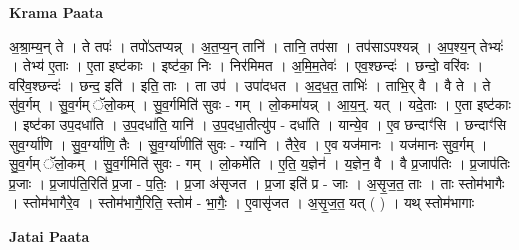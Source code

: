 \documentclass[17pt]{extarticle}
\begin{document}
\textbf{Krama Paata} \newline

अ॒श्रा॒म्य॒न् ते । ते तपः॑ । तपो॑ऽतप्यन्न् । अ॒त॒प्य॒न् तानि॑ । तानि॒ तप॑सा । तप॑साऽपश्यन्न् । अ॒प॒श्य॒न् तेभ्यः॑ । तेभ्य॑ ए॒ताः । ए॒ता इष्ट॑काः । इष्ट॑का॒ निः । निर॑मिमत । अ॒मि॒म॒तेवः॑ । एव॒श्छन्दः॑ । छन्दो॒ वरि॑वः । वरि॑व॒श्छन्दः॑ । छन्द॒ इति॑ । इति॒ ताः । ता उप॑ । उपा॑दधत । अ॒द॒ध॒त॒ ताभिः॑ । ताभि॒र् वै । वै ते । ते सु॑व॒र्गम् । सु॒व॒र्गम् ॅलो॒कम् । सु॒व॒र्गमिति॑ सुवः - गम् । लो॒कमा॑यन्न् । आ॒य॒न्॒. यत् । यदे॒ताः । ए॒ता इष्ट॑काः । इष्ट॑का उप॒दधा॑ति । उ॒प॒दधा॑ति॒ यानि॑ । उ॒प॒दधा॒तीत्यु॑प - दधा॑ति । यान्ये॒व । ए॒व छन्दाꣳ॑सि । छन्दाꣳ॑सि सुव॒र्ग्या॑णि । सु॒व॒र्ग्या॑णि॒ तैः । सु॒व॒र्ग्या॑णीति॑ सुवः - ग्या॑नि । तैरे॒व । ए॒व यज॑मानः । यज॑मानः सुव॒र्गम् । सु॒व॒र्गम् ॅलो॒कम् । सु॒व॒र्गमिति॑ सुवः - गम् । लो॒कमे॑ति । ए॒ति॒ य॒ज्ञेन॑ । य॒ज्ञेन॒ वै । वै प्र॒जाप॑तिः । प्र॒जाप॑तिः प्र॒जाः । प्र॒जाप॑ति॒रिति॑ प्र॒जा - प॒तिः॒ । प्र॒जा अ॑सृजत । प्र॒जा इति॑ प्र - जाः । अ॒सृ॒ज॒त॒ ताः । ताः स्तोम॑भागैः । स्तोम॑भागैरे॒व । स्तोम॑भागै॒रिति॒ स्तोम॑ - भा॒गैः॒ । ए॒वासृ॑जत । अ॒सृ॒ज॒त॒ यत् ( ) । यथ् स्तोम॑भागाः \newline

\textbf{Jatai Paata} \newline
\end{document}
